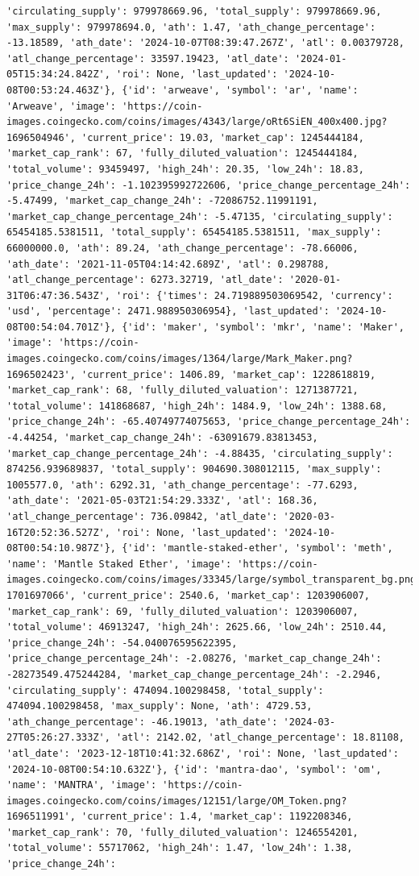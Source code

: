 \documentclass[
  letterpaper,
  DIV=11,
  numbers=noendperiod]{scrreprt}
\begin{document}
\begin{verbatim}
'circulating_supply': 979978669.96, 'total_supply': 979978669.96, 'max_supply': 979978694.0, 'ath': 1.47, 'ath_change_percentage': -13.18589, 'ath_date': '2024-10-07T08:39:47.267Z', 'atl': 0.00379728, 'atl_change_percentage': 33597.19423, 'atl_date': '2024-01-05T15:34:24.842Z', 'roi': None, 'last_updated': '2024-10-08T00:53:24.463Z'}, {'id': 'arweave', 'symbol': 'ar', 'name': 'Arweave', 'image': 'https://coin-images.coingecko.com/coins/images/4343/large/oRt6SiEN_400x400.jpg?1696504946', 'current_price': 19.03, 'market_cap': 1245444184, 'market_cap_rank': 67, 'fully_diluted_valuation': 1245444184, 'total_volume': 93459497, 'high_24h': 20.35, 'low_24h': 18.83, 'price_change_24h': -1.102395992722606, 'price_change_percentage_24h': -5.47499, 'market_cap_change_24h': -72086752.11991191, 'market_cap_change_percentage_24h': -5.47135, 'circulating_supply': 65454185.5381511, 'total_supply': 65454185.5381511, 'max_supply': 66000000.0, 'ath': 89.24, 'ath_change_percentage': -78.66006, 'ath_date': '2021-11-05T04:14:42.689Z', 'atl': 0.298788, 'atl_change_percentage': 6273.32719, 'atl_date': '2020-01-31T06:47:36.543Z', 'roi': {'times': 24.719889503069542, 'currency': 'usd', 'percentage': 2471.988950306954}, 'last_updated': '2024-10-08T00:54:04.701Z'}, {'id': 'maker', 'symbol': 'mkr', 'name': 'Maker', 'image': 'https://coin-images.coingecko.com/coins/images/1364/large/Mark_Maker.png?1696502423', 'current_price': 1406.89, 'market_cap': 1228618819, 'market_cap_rank': 68, 'fully_diluted_valuation': 1271387721, 'total_volume': 141868687, 'high_24h': 1484.9, 'low_24h': 1388.68, 'price_change_24h': -65.40749774075653, 'price_change_percentage_24h': -4.44254, 'market_cap_change_24h': -63091679.83813453, 'market_cap_change_percentage_24h': -4.88435, 'circulating_supply': 874256.939689837, 'total_supply': 904690.308012115, 'max_supply': 1005577.0, 'ath': 6292.31, 'ath_change_percentage': -77.6293, 'ath_date': '2021-05-03T21:54:29.333Z', 'atl': 168.36, 'atl_change_percentage': 736.09842, 'atl_date': '2020-03-16T20:52:36.527Z', 'roi': None, 'last_updated': '2024-10-08T00:54:10.987Z'}, {'id': 'mantle-staked-ether', 'symbol': 'meth', 'name': 'Mantle Staked Ether', 'image': 'https://coin-images.coingecko.com/coins/images/33345/large/symbol_transparent_bg.png?1701697066', 'current_price': 2540.6, 'market_cap': 1203906007, 'market_cap_rank': 69, 'fully_diluted_valuation': 1203906007, 'total_volume': 46913247, 'high_24h': 2625.66, 'low_24h': 2510.44, 'price_change_24h': -54.040076595622395, 'price_change_percentage_24h': -2.08276, 'market_cap_change_24h': -28273549.475244284, 'market_cap_change_percentage_24h': -2.2946, 'circulating_supply': 474094.100298458, 'total_supply': 474094.100298458, 'max_supply': None, 'ath': 4729.53, 'ath_change_percentage': -46.19013, 'ath_date': '2024-03-27T05:26:27.333Z', 'atl': 2142.02, 'atl_change_percentage': 18.81108, 'atl_date': '2023-12-18T10:41:32.686Z', 'roi': None, 'last_updated': '2024-10-08T00:54:10.632Z'}, {'id': 'mantra-dao', 'symbol': 'om', 'name': 'MANTRA', 'image': 'https://coin-images.coingecko.com/coins/images/12151/large/OM_Token.png?1696511991', 'current_price': 1.4, 'market_cap': 1192208346, 'market_cap_rank': 70, 'fully_diluted_valuation': 1246554201, 'total_volume': 55717062, 'high_24h': 1.47, 'low_24h': 1.38, 'price_change_24h': 
\end{verbatim}
\end{document}
